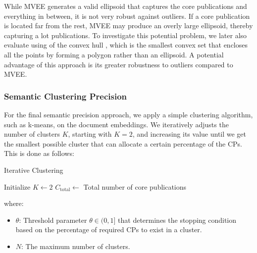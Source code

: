 While MVEE generates a valid ellipsoid that captures the core publications and everything in between, it is not very robust against outliers. If a core publication is located far from the rest, MVEE may produce an overly large ellipsoid, thereby capturing a lot publications. To investigate this potential problem, we later also evaluate using of the convex hull \autocite{Kirkpatrick1986}, which is the smallest convex set that encloses all the points by forming a polygon rather than an ellipsoid. A potential advantage of this approach is its greater robustness to outliers compared to MVEE.

\subsubsection{Semantic Clustering Precision}

For the final semantic precision approach, we apply a simple clustering algorithm, such as k-means, on the document embeddings. We iteratively adjusts the number of clusters $K$, starting with $K=2$, and increasing its value until we get the smallest possible cluster that can allocate a certain percentage of the CPs. This is done as follows:

\begin{algorithm}[!h]
	\caption{Iterative Clustering}
	Initialize $K \gets 2$ \;
	$C_{\text{total}} \gets$ Total number of core publications\;
	
	\label{algo:sp-clustering}
\end{algorithm}

\noindent where:
\begin{itemize}
	\item \( \theta \): Threshold parameter $\theta \in (0, 1]$ that determines the stopping condition based on the percentage of required CPs to exist in a cluster.
	\item $N$: The maximum number of clusters.
\end{itemize}

